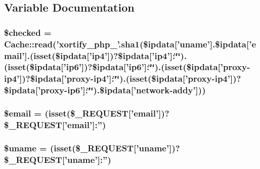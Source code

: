\subsection{Variable Documentation}
\hypertarget{projecthoneypot_8org_2post_8loader_8php_aae831eeaf71994cc7e31c1412a29f6fd}{
\subsubsection[{\$checked}]{\setlength{\rightskip}{0pt plus 5cm}\$checked = {\bf Cache\-::read}('xortify\-\_\-php\-\_\-'.sha1(\$ipdata\mbox{[}'uname'\mbox{]}.\$ipdata\mbox{[}'email'\mbox{]}.(isset(\$ipdata\mbox{[}'ip4'\mbox{]})?\$ipdata\mbox{[}'ip4'\mbox{]}\-:\char`\"{}\char`\"{}).(isset(\$ipdata\mbox{[}'ip6'\mbox{]})?\$ipdata\mbox{[}'ip6'\mbox{]}\-:\char`\"{}\char`\"{}).(isset(\$ipdata\mbox{[}'proxy-\/ip4'\mbox{]})?\$ipdata\mbox{[}'proxy-\/ip4'\mbox{]}\-:\char`\"{}\char`\"{}).(isset(\$ipdata\mbox{[}'proxy-\/ip4'\mbox{]})?\$ipdata\mbox{[}'proxy-\/ip6'\mbox{]}\-:\char`\"{}\char`\"{}).\$ipdata\mbox{[}'network-\/addy'\mbox{]}))}}\label{projecthoneypot_8org_2post_8loader_8php_aae831eeaf71994cc7e31c1412a29f6fd}
\hypertarget{projecthoneypot_8org_2post_8loader_8php_ad634f418b20382e2802f80532d76d3cd}{
\subsubsection[{\$email}]{\setlength{\rightskip}{0pt plus 5cm}\$email = (isset(\$\-\_\-\-R\-E\-Q\-U\-E\-S\-T\mbox{[}'email'\mbox{]})?\$\-\_\-\-R\-E\-Q\-U\-E\-S\-T\mbox{[}'email'\mbox{]}\-:'')}}\label{projecthoneypot_8org_2post_8loader_8php_ad634f418b20382e2802f80532d76d3cd}
\hypertarget{projecthoneypot_8org_2post_8loader_8php_a227a9443cabbe5e23cfc10c4371e09d1}{
\subsubsection[{\$uname}]{\setlength{\rightskip}{0pt plus 5cm}\$uname = (isset(\$\-\_\-\-R\-E\-Q\-U\-E\-S\-T\mbox{[}'uname'\mbox{]})?\$\-\_\-\-R\-E\-Q\-U\-E\-S\-T\mbox{[}'uname'\mbox{]}\-:'')}}\label{projecthoneypot_8org_2post_8loader_8php_a227a9443cabbe5e23cfc10c4371e09d1}
